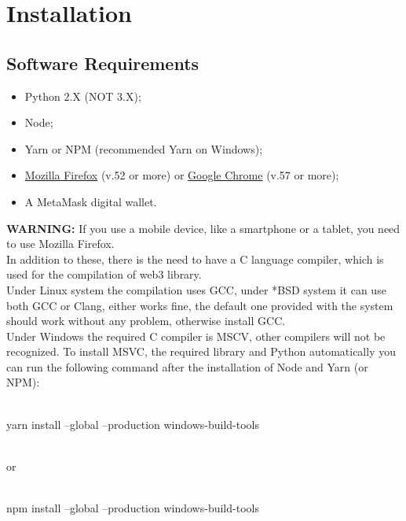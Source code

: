 \documentclass[ManualeSviluppatore]{subfiles}
\begin{document}
\chapter{Installation}
\section{Software Requirements}
\begin{itemize}
	\item Python 2.X (NOT 3.X);
	\item Node;
	\item Yarn or NPM (recommended Yarn on Windows);
	\item \href{https://www.mozilla.org/en-US/firefox/new/}{Mozilla Firefox} (v.52 or more) or	
	\href{https://www.google.com/intl/en/chrome/}{Google Chrome} (v.57 or more);
	\item A MetaMask digital wallet.
\end{itemize}

\textbf{WARNING:} If you use a mobile device, like a smartphone or a tablet, you need to use Mozilla Firefox. \\

In addition to these, there is the need to have a C language compiler, which is used for the compilation of web3 library.\\

Under Linux system the compilation uses GCC, under *BSD system it can use both GCC or Clang, 	
either works fine, the default one provided with the system should work without any problem, otherwise install GCC. \\

Under Windows the required C compiler is MSCV, other compilers will not be recognized. To install MSVC, the required library and Python automatically you can run the following command after the installation of Node and Yarn (or NPM): \\\\
\begin{ttfamily}
\indent	yarn install --global --production windows-build-tools \\\\
\end{ttfamily}
or \\\\
\begin{ttfamily}
\indent npm install --global --production windows-build-tools \\\\
\end{ttfamily}
\end{document}
